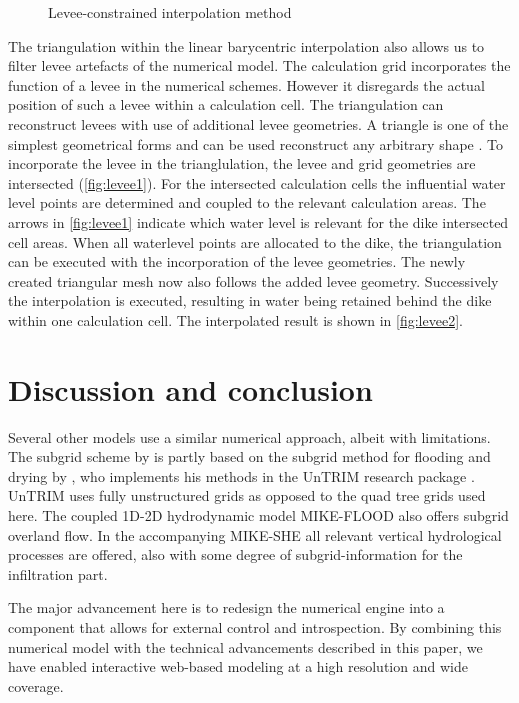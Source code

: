 \documentclass[a4paper]{article}
\begin{document}
\begin{figure}[htbp]
  \caption{Levee-constrained interpolation method}

\end{figure}

The triangulation within the linear barycentric interpolation also allows us to filter levee artefacts of the numerical model. The calculation grid incorporates the function of a levee in the numerical schemes. However it disregards the actual position of such a levee within a calculation cell. The triangulation can reconstruct levees with use of additional levee geometries. A triangle is one of the simplest geometrical forms and can be used reconstruct any arbitrary shape \citep{Welch1994}. To incorporate the levee in the trianglulation, the levee and grid geometries are intersected (\autoref{fig:levee1}). For the intersected calculation cells the influential water level points are determined and coupled to the relevant calculation areas. The arrows in \autoref{fig:levee1} indicate which water level is relevant for the dike intersected cell areas. When all waterlevel points are allocated to the dike, the triangulation can be executed with the incorporation of the levee geometries. The newly created triangular mesh now also follows the added levee geometry. Successively the interpolation is executed, resulting in water being retained behind the dike within one calculation cell. The interpolated result is shown in \autoref{fig:levee2}.



\section{Discussion and conclusion}
Several other models use a similar numerical approach, albeit with limitations. The subgrid scheme by \citet{Stelling2012} is partly based on the subgrid method for flooding and drying by \citet{Casulli2009}, who implements his methods in the UnTRIM research package \citet{Casulli2000}. UnTRIM uses fully unstructured grids as opposed to the quad tree grids used here. The coupled 1D-2D hydrodynamic model MIKE-FLOOD \citep{Dhi2014} also offers subgrid overland flow. In the accompanying MIKE-SHE all relevant vertical hydrological processes are offered, also with some degree of subgrid-information for the infiltration part.

The major advancement here is to redesign the numerical engine into a component that allows for external control and introspection. By combining this numerical model with the technical advancements described in this paper, we have enabled interactive web-based modeling at a high resolution and wide coverage.
\end{document}
